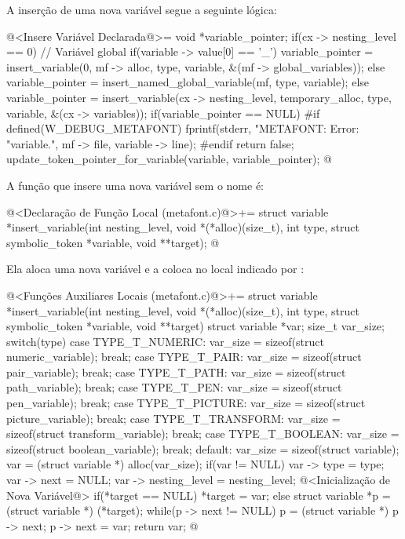 A inserção de uma nova variável segue a seguinte lógica:

\iniciocodigo
@<Insere Variável Declarada@>=
{
  void *variable_pointer;
  if(cx -> nesting_level == 0){ // Variável global
    if(variable -> value[0] == '_')
      variable_pointer = insert_variable(0, mf -> alloc, type, variable,
                                         &(mf -> global_variables));
    else
      variable_pointer = insert_named_global_variable(mf, type, variable);
  }
  else
    variable_pointer = insert_variable(cx -> nesting_level,
                                      temporary_alloc, type,
                                      variable, &(cx -> variables));
  if(variable_pointer == NULL){
#if defined(W_DEBUG_METAFONT)
      fprintf(stderr, "METAFONT: Error: %
                    "variable.\n", mf -> file, variable -> line);
#endif
    return false;
  }
  update_token_pointer_for_variable(variable, variable_pointer);
}
@
\fimcodigo

A função que insere uma nova variável sem o nome é:

\iniciocodigo
@<Declaração de Função Local (metafont.c)@>+=
struct variable *insert_variable(int nesting_level,
                                 void *(*alloc)(size_t),
                                 int type,
                                 struct symbolic_token *variable,
                                 void **target);
@
\fimcodigo

Ela aloca uma nova variável e a coloca no local indicado
por :

\iniciocodigo
@<Funções Auxiliares Locais (metafont.c)@>+=
struct variable *insert_variable(int nesting_level,
                                 void *(*alloc)(size_t),
                                 int type,
                                 struct symbolic_token *variable,
                                 void **target){
  struct variable *var;
  size_t var_size;
  switch(type){
    case TYPE_T_NUMERIC:
      var_size = sizeof(struct numeric_variable);
      break;
    case TYPE_T_PAIR:
      var_size = sizeof(struct pair_variable);
      break;
    case TYPE_T_PATH:
      var_size = sizeof(struct path_variable);
      break;
    case TYPE_T_PEN:
      var_size = sizeof(struct pen_variable);
      break;
    case TYPE_T_PICTURE:
      var_size = sizeof(struct picture_variable);
      break;
    case TYPE_T_TRANSFORM:
      var_size = sizeof(struct transform_variable);
      break;
    case TYPE_T_BOOLEAN:
      var_size = sizeof(struct boolean_variable);
      break;
    default:
      var_size = sizeof(struct variable);
  }
  var = (struct variable *) alloc(var_size);
  if(var != NULL){
    var -> type = type;
    var -> next = NULL;
    var -> nesting_level = nesting_level;
    @<Inicialização de Nova Variável@>
  }
  if(*target == NULL)
    *target = var;
  else{
    struct variable *p = (struct variable *) (*target);
    while(p -> next != NULL)
      p = (struct variable *) p -> next;
    p -> next = var;
  }
  return var;
}
@
\fimcodigo

